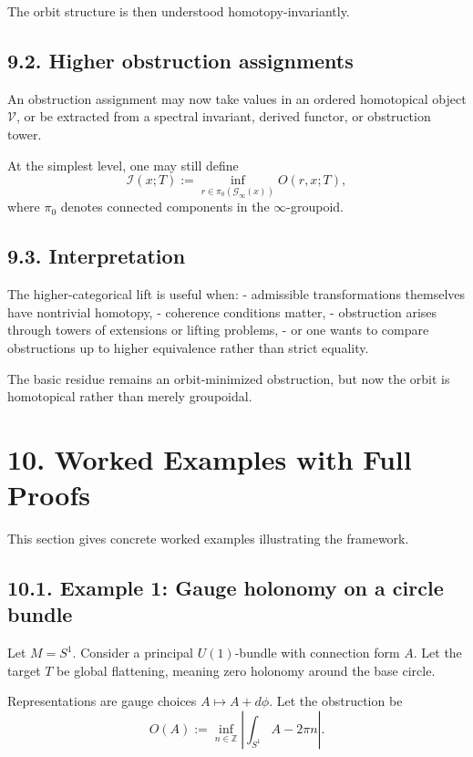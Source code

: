 \documentclass[
]{article}
\begin{document}
The orbit structure is then understood homotopy-invariantly.

\subsection{9.2. Higher obstruction
assignments}\label{higher-obstruction-assignments}

An obstruction assignment may now take values in an ordered homotopical
object \(\mathcal{V}\), or be extracted from a spectral invariant,
derived functor, or obstruction tower.

At the simplest level, one may still define \[
\mathcal{I}(x;T) := \inf_{r \in \pi_0(\mathcal{G}_\infty(x))} O(r,x;T),
\] where \(\pi_0\) denotes connected components in the
\(\infty\)-groupoid.

\subsection{9.3. Interpretation}\label{interpretation-2}

The higher-categorical lift is useful when: - admissible transformations
themselves have nontrivial homotopy, - coherence conditions matter, -
obstruction arises through towers of extensions or lifting problems, -
or one wants to compare obstructions up to higher equivalence rather
than strict equality.

The basic residue remains an orbit-minimized obstruction, but now the
orbit is homotopical rather than merely groupoidal.

\section{10. Worked Examples with Full
Proofs}\label{worked-examples-with-full-proofs}

This section gives concrete worked examples illustrating the framework.

\subsection{10.1. Example 1: Gauge holonomy on a circle
bundle}\label{example-1-gauge-holonomy-on-a-circle-bundle}

Let \(M = S^1\). Consider a principal \(U(1)\)-bundle with connection
form \(A\). Let the target \(T\) be global flattening, meaning zero
holonomy around the base circle.

Representations are gauge choices \(A \mapsto A + d\phi\). Let the
obstruction be \[
O(A) := \inf_{n \in \mathbb{Z}} \left| \int_{S^1} A - 2\pi n \right|.
\]
\end{document}
